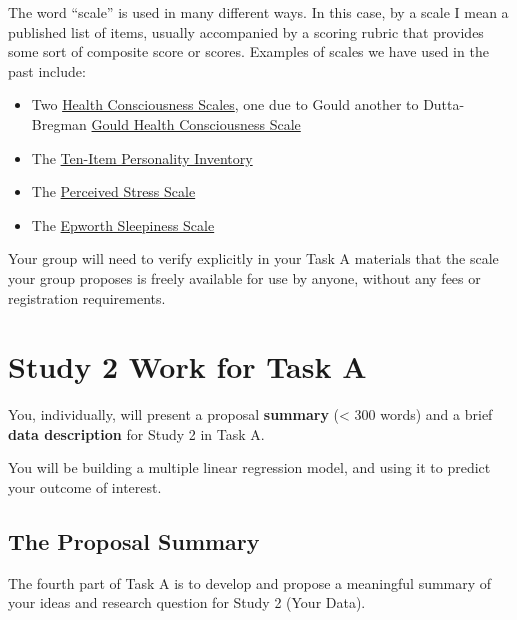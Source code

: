 \documentclass[]{book}
\providecommand{\tightlist}{%
  \setlength{\itemsep}{0pt}\setlength{\parskip}{0pt}}
\theoremstyle{definition}
\theoremstyle{definition}
\theoremstyle{definition}
\theoremstyle{remark}
\begin{document}
The word ``scale'' is used in many different ways. In this case, by a
scale I mean a published list of items, usually accompanied by a scoring
rubric that provides some sort of composite score or scores. Examples of
scales we have used in the past include:

\begin{itemize}
\tightlist
\item
  Two \href{https://chirr.nlm.nih.gov/health-orientation.php}{Health
  Consciousness Scales}, one due to Gould another to Dutta-Bregman
  \href{https://chirr.nlm.nih.gov/health-orientation.php}{Gould Health
  Consciousness Scale}
\item
  The
  \href{https://gosling.psy.utexas.edu/scales-weve-developed/ten-item-personality-measure-tipi/ten-item-personality-inventory-tipi/}{Ten-Item
  Personality Inventory}
\item
  The
  \href{https://das.nh.gov/wellness/Docs/Percieved\%20Stress\%20Scale.pdf}{Perceived
  Stress Scale}
\item
  The
  \href{https://www.sleepapnea.org/assets/files/pdf/ESS\%20PDF\%201990-97.pdf}{Epworth
  Sleepiness Scale}
\end{itemize}

Your group will need to verify explicitly in your Task A materials that
the scale your group proposes is freely available for use by anyone,
without any fees or registration requirements.

\hypertarget{study-2-work-for-task-a}{%
\section{Study 2 Work for Task A}\label{study-2-work-for-task-a}}

You, individually, will present a proposal \textbf{summary} (\textless{}
300 words) and a brief \textbf{data description} for Study 2 in Task A.

You will be building a multiple linear regression model, and using it to
predict your outcome of interest.

\hypertarget{the-proposal-summary}{%
\subsection{The Proposal Summary}\label{the-proposal-summary}}

The fourth part of Task A is to develop and propose a meaningful summary
of your ideas and research question for Study 2 (Your Data).
\end{document}
